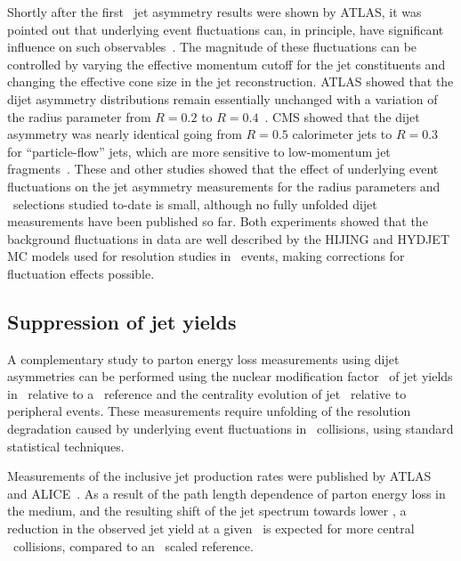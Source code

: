 Shortly after the first \PbPb\ jet asymmetry results were shown by ATLAS, it was pointed out that
underlying event fluctuations can, in principle, have significant influence
on such observables~\cite{Cacciari:2011tm}. The magnitude of these fluctuations can be controlled 
by varying the effective momentum cutoff for the jet constituents 
and changing the effective cone size in the jet reconstruction. ATLAS showed that the dijet asymmetry
distributions remain essentially unchanged with a variation of the radius parameter from $R=0.2$ 
to $R=0.4$~\cite{Cole:2011zz}. CMS showed that the dijet asymmetry was nearly identical
going from $R=0.5$ calorimeter jets to $R=0.3$ for ``particle-flow'' jets, which are more sensitive
to low-momentum jet fragments~\cite{Nguyen:2011fg}. These and other studies showed that the effect
of underlying event fluctuations on the jet asymmetry measurements for the radius parameters
and \pT\ selections studied to-date is small, although no fully unfolded dijet measurements
have been published so far.  Both experiments showed that the 
background fluctuations in data are well described by the HIJING and HYDJET MC models used
for resolution studies in \PbPb\ events, making corrections for fluctuation effects possible. 

\subsection{Suppression of jet yields}

A complementary study to parton energy loss measurements using dijet asymmetries
can be performed using the nuclear modification factor \Raa\ of jet yields in \PbPb\ relative
to a \pp\ reference and the centrality evolution of jet \Rcp\ relative to peripheral events. These 
measurements require unfolding of the resolution degradation caused by underlying event 
fluctuations in \PbPb\ collisions, using standard statistical techniques.

Measurements of the inclusive jet production rates were published by ATLAS~\cite{Aad:2012is} and 
ALICE~\cite{Abelev:2013kqa}.
As a result of the path length dependence of parton energy loss in the medium, and 
the resulting shift of the jet spectrum towards lower \pT,
a reduction in the observed jet yield at a given \pT\ is expected for more 
central \PbPb\ collisions, compared to an \Ncoll\ scaled reference.


